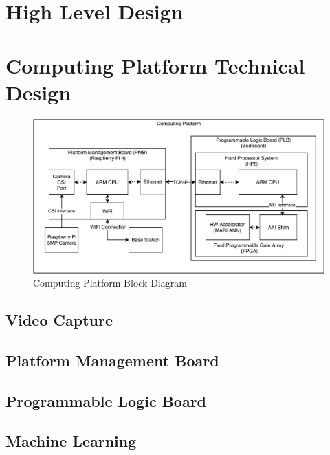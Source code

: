 \documentclass[10pt,letterpaper]{article}
\begin{document}
\section{High Level Design}\label{high_level_design}


\section{Computing Platform Technical Design}\label{computing_platform}

\begin{figure}[H]\label{pcdiag}
\centering
\includegraphics[width=16.5cm]{img/pc_diagram.pdf}
\caption{Computing Platform Block Diagram}
\end{figure}

\subsection{Video Capture}\label{video_capture}


\subsection{Platform Management Board}\label{platform_management}


\subsection{Programmable Logic Board}\label{programmable_logic}


\subsection{Machine Learning}\label{machine_learning}

\end{document}
